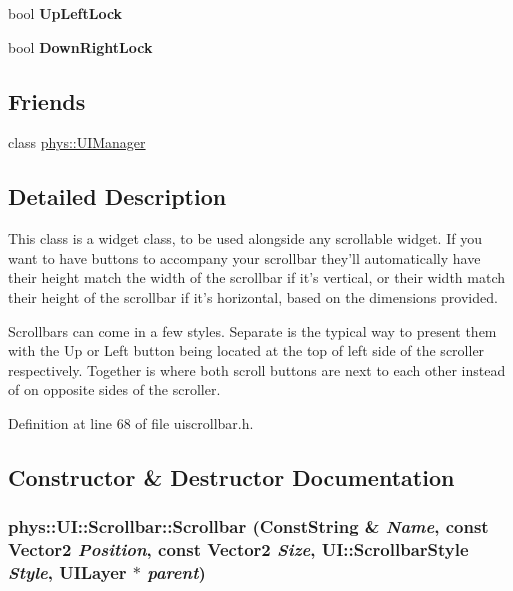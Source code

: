 \begin{DoxyCompactItemize}
\item 
\hypertarget{classphys_1_1UI_1_1Scrollbar_a10a45c7c3aad71f760b419412786eb8c}{
bool {\bfseries UpLeftLock}}
\label{d0/d3e/classphys_1_1UI_1_1Scrollbar_a10a45c7c3aad71f760b419412786eb8c}

\item 
\hypertarget{classphys_1_1UI_1_1Scrollbar_a133c6d99a33147a62826f0e0c925fcec}{
bool {\bfseries DownRightLock}}
\label{d0/d3e/classphys_1_1UI_1_1Scrollbar_a133c6d99a33147a62826f0e0c925fcec}

\end{DoxyCompactItemize}
\subsection*{Friends}
\begin{DoxyCompactItemize}
\item 
\hypertarget{classphys_1_1UI_1_1Scrollbar_a4b52bf8c4d934bf192ccfc8198b55394}{
class \hyperlink{classphys_1_1UI_1_1Scrollbar_a4b52bf8c4d934bf192ccfc8198b55394}{phys::UIManager}}
\label{d0/d3e/classphys_1_1UI_1_1Scrollbar_a4b52bf8c4d934bf192ccfc8198b55394}

\end{DoxyCompactItemize}


\subsection{Detailed Description}
This class is a widget class, to be used alongside any scrollable widget. If you want to have buttons to accompany your scrollbar they'll automatically have their height match the width of the scrollbar if it's vertical, or their width match their height of the scrollbar if it's horizontal, based on the dimensions provided. \par
 Scrollbars can come in a few styles. Separate is the typical way to present them with the Up or Left button being located at the top of left side of the scroller respectively. Together is where both scroll buttons are next to each other instead of on opposite sides of the scroller. 

Definition at line 68 of file uiscrollbar.h.



\subsection{Constructor \& Destructor Documentation}
\hypertarget{classphys_1_1UI_1_1Scrollbar_a25d95bba23d00bd2e377258068e4a0bb}{
\subsubsection[{Scrollbar}]{\setlength{\rightskip}{0pt plus 5cm}phys::UI::Scrollbar::Scrollbar ({\bf ConstString} \& {\em Name}, \/  const {\bf Vector2} {\em Position}, \/  const {\bf Vector2} {\em Size}, \/  UI::ScrollbarStyle {\em Style}, \/  {\bf UILayer} $\ast$ {\em parent})}}
\label{d0/d3e/classphys_1_1UI_1_1Scrollbar_a25d95bba23d00bd2e377258068e4a0bb}


